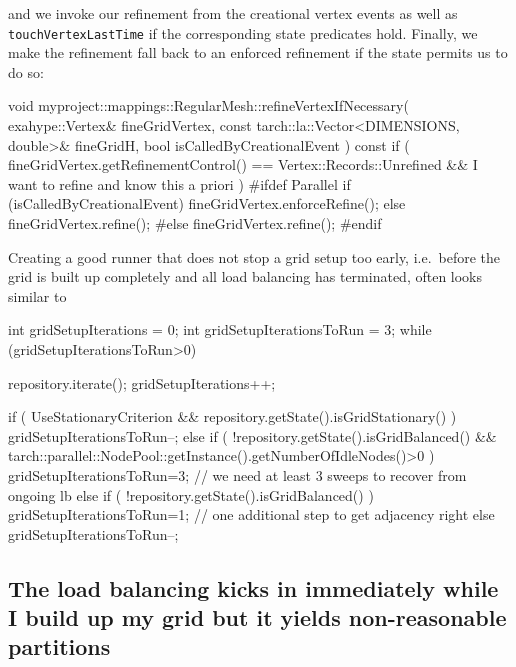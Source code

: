 \noindent
and we invoke our refinement from the creational vertex events as well as
\texttt{touchVertexLastTime} if the corresponding state predicates hold.
Finally, we make the refinement fall back to an enforced refinement if the state
permits us to do so:
\begin{code}
void myproject::mappings::RegularMesh::refineVertexIfNecessary(
  exahype::Vertex&                              fineGridVertex,
  const tarch::la::Vector<DIMENSIONS, double>&  fineGridH,
  bool                                          isCalledByCreationalEvent
) const {
  if (
    fineGridVertex.getRefinementControl() == Vertex::Records::Unrefined
    &&
    I want to refine and know this a priori
  ) {
    #ifdef Parallel
    if (isCalledByCreationalEvent) {
      fineGridVertex.enforceRefine();
    }
    else {
      fineGridVertex.refine();
    }
    #else
    fineGridVertex.refine();
    #endif
  }
}
\end{code}


\noindent
Creating a good runner that does not stop a grid setup too early, i.e.~before
the grid is built up completely and all load balancing has terminated, often
looks similar to
\begin{code}
int gridSetupIterations      = 0;
int gridSetupIterationsToRun = 3;
while (gridSetupIterationsToRun>0) {
  repository.iterate();
  gridSetupIterations++;
   
  if ( UseStationaryCriterion && repository.getState().isGridStationary() ) {
    gridSetupIterationsToRun--;
  }
  else if ( !repository.getState().isGridBalanced() && 
    tarch::parallel::NodePool::getInstance().getNumberOfIdleNodes()>0 ) {
    gridSetupIterationsToRun=3;  // we need at least 3 sweeps to recover from ongoing lb 
  }
  else if ( !repository.getState().isGridBalanced()  ) {
    gridSetupIterationsToRun=1;  // one additional step to get adjacency right
  }
  else {
    gridSetupIterationsToRun--;
  }
}
\end{code}



\subsection{The load balancing kicks in immediately while I build up my grid but it
yields non-reasonable partitions}


